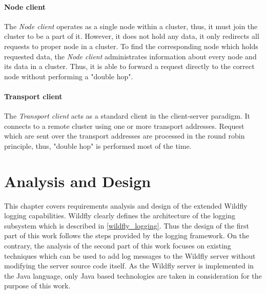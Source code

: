 \documentclass[12pt,oneside]{fithesis2}
\begin{document}
\subsubsection{Node client}
The \textit{Node client} operates as a single node within a cluster, thus, it must join the cluster to be a part of it. However, it does not hold any data, it only redirects all requests to proper node in a cluster. To find the corresponding node which holds requested data, the \textit{Node client} administrates information about every node and its data in a cluster. Thus, it is able to forward a request directly to the correct node without performing a "double hop".

\subsubsection{Transport client}
The \textit{Transport client} acts as a standard client in the client-server paradigm. It connects to a remote cluster using one or more transport addresses. Request which are sent over the transport addresses are processed in the round robin principle, thus, "double hop" is performed most of the time.

\chapter{Analysis and Design}
This chapter covers requirements analysis and design of the extended Wildfly logging capabilities. Wildfly clearly defines the architecture of the logging subsystem which is described in \ref{wildfly_logging}. Thus the design of the first part of this work follows the steps provided by the logging framework. On the contrary, the analysis of the second part of this work focuses on existing techniques which can be used to add log messages to the Wildfly server without modifying the server source code itself. As the Wildfly server is implemented in the Java language, only Java based technologies are taken in consideration for the purpose of this work.



\end{document}
